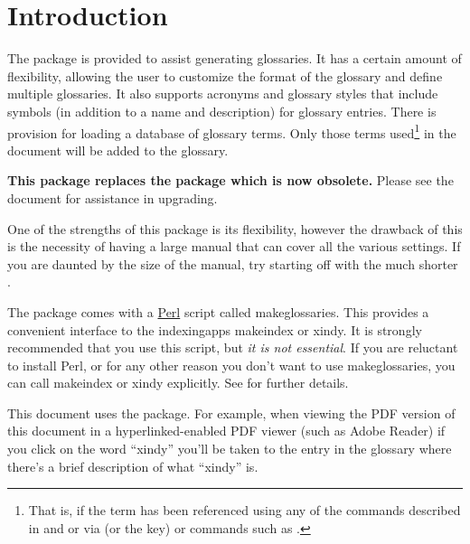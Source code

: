 \documentclass[report]{nlctdoc}
\newcommand*{\gloskey}[2][newglossaryentry]{\csopt{#1}{#2}}
\begin{document}
\clearpage
\tableofcontents

\clearpage
\printglossaries

 \chapter{Introduction}
\label{sec:intro}

The  package is provided to assist generating
glossaries. It has a certain amount of flexibility, allowing the
user to customize the format of the glossary and define multiple
glossaries. It also supports acronyms and glossary styles that
include symbols (in addition to a name and description) for glossary
entries. There is provision for loading a database of glossary
terms. Only those terms used\footnote{That is, if the term has been
referenced using any of the commands described in
 and  or via
 (or the \gloskey{see} key) or commands such as
.} in the document will be added to the glossary.

\textbf{This package replaces the  package which is
now obsolete.} Please see the document  for
assistance in upgrading.

One of the strengths of this package is its flexibility, however
the drawback of this is the necessity of having a large manual
that can cover all the various settings. If you are daunted by the
size of the manual, try starting off with the much shorter
.

\begin{important}
The  package comes with a
\href{http://www.perl.org/about.html}{Perl} script called
\gls{makeglossaries}. This provides a convenient interface to the
\glspl{indexingapp} \gls{makeindex} or \gls{xindy}. It is strongly
recommended that you use this script, but \emph{it is not
essential}. If you are reluctant to install Perl, or for any other
reason you don't want to use \gls*{makeglossaries}, you can call
\gls*{makeindex} or \gls*{xindy} explicitly. See
 for further details.
\end{important}
This document uses the  package. For example,
when viewing the PDF version of this document in a
hyperlinked-enabled PDF viewer (such as Adobe Reader) if
you click on the word ``\gls{xindy}'' you'll be taken to the entry
in the glossary where there's a brief description of
what ``\gls*{xindy}'' is.
\end{document}

